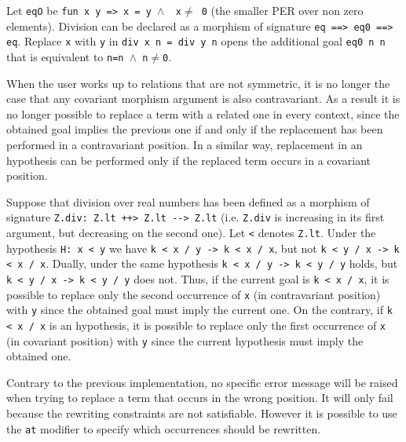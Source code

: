 \begin{cscexample}
Let \texttt{eqO} be \texttt{fun x y => x = y $\land$ ~x$\neq$ 0} (the smaller PER over
non zero elements). Division can be declared as a morphism of signature
\texttt{eq ==> eq0 ==> eq}. Replace \texttt{x} with \texttt{y} in
\texttt{div x n = div y n} opens the additional goal \texttt{eq0 n n} that
is equivalent to \texttt{n=n $\land$ n$\neq$0}.
\end{cscexample}

When the user works up to relations that are not symmetric, it is no longer
the case that any covariant morphism argument is also contravariant. As a
result it is no longer possible to replace a term with a related one in
every context, since the obtained goal implies the previous one if and
only if the replacement has been performed in a contravariant position.
In a similar way, replacement in an hypothesis can be performed only if
the replaced term occurs in a covariant position.

\begin{cscexample}
Suppose that division over real numbers has been defined as a
morphism of signature \texttt{Z.div: Z.lt ++> Z.lt -{}-> Z.lt} (i.e.
\texttt{Z.div} is increasing in its first argument, but decreasing on the
second one). Let \texttt{<} denotes \texttt{Z.lt}.
Under the hypothesis \texttt{H: x < y} we have
\texttt{k < x / y -> k < x / x}, but not
\texttt{k < y / x -> k < x / x}.
Dually, under the same hypothesis \texttt{k < x / y -> k < y / y} holds,
but \texttt{k < y / x -> k < y / y} does not.
Thus, if the current goal is \texttt{k < x / x}, it is possible to replace
only the second occurrence of \texttt{x} (in contravariant position)
with \texttt{y} since the obtained goal must imply the current one.
On the contrary, if \texttt{k < x / x} is
an hypothesis, it is possible to replace only the first occurrence of
\texttt{x} (in covariant position) with \texttt{y} since
the current hypothesis must imply the obtained one.
\end{cscexample}

Contrary to the previous implementation, no specific error message will
be raised when trying to replace a term that occurs in the wrong
position. It will only fail because the rewriting constraints are not
satisfiable. However it is possible to use the \texttt{at} modifier to
specify which occurrences should be rewritten.

